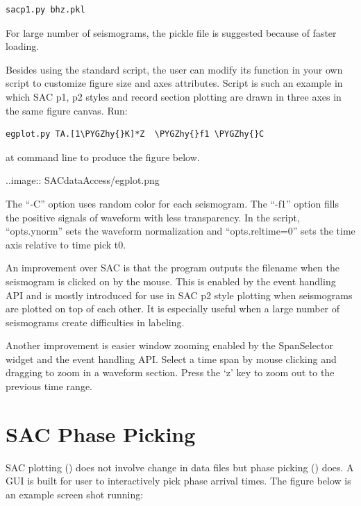 \documentclass[letterpaper,10pt,english]{sphinxmanual}
\def\PYGZhy{\char`\-}
\begin{document}
\begin{Verbatim}[commandchars=\\\{\}]
sacp1.py bhz.pkl
\end{Verbatim}

For large number of seismograms, the pickle file is suggested because of faster loading.

Besides using the standard  script, the user can modify its  function in your own script to customize figure size and axes attributes. Script  is such an example in which SAC p1, p2 styles and record section plotting are drawn in three axes in the same figure canvas. Run:

\begin{Verbatim}[commandchars=\\\{\}]
egplot.py TA.[1\PYGZhy{}K]*Z  \PYGZhy{}f1 \PYGZhy{}C
\end{Verbatim}

at command line to produce the figure below.

..image:: SACdataAccess/egplot.png

The ``-C'' option uses random color for each seismogram.
The ``-f1'' option fills the positive signals of waveform with less transparency.
In the script, ``opts.ynorm'' sets the waveform normalization and ``opts.reltime=0'' sets the time axis relative to time pick t0.

An improvement over SAC is that the program outputs the filename when the seismogram is clicked on by the mouse. This is enabled by the event handling API and is mostly introduced for use in SAC p2 style plotting when seismograms are plotted on top of each other. It is especially useful when a large number of seismograms create difficulties in labeling.

Another improvement is easier window zooming enabled by the SpanSelector widget and the event handling API. Select a time span by mouse clicking and dragging to zoom in a waveform section.
Press the `z' key to zoom out to the previous time range.


\section{SAC Phase Picking}
\label{docfiles/SACdataAccess:sac-phase-picking}
SAC plotting () does not involve change in data files but phase picking () does. A GUI is built for user to interactively pick phase arrival times. The figure below is an example screen shot running:
\end{document}
